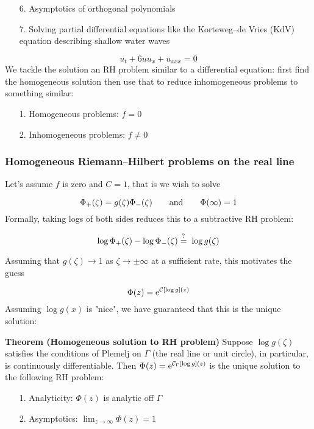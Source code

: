\documentclass[12pt,landscape]{article}
\def\qqand{\qquad\hbox{and}\qquad}
\def\E{ {\rm e} }
\def\CC{ {\cal C} }
\def\endash{–}
\def\questionequals{= \!\!\!\!\!\!{\scriptstyle ? \atop }\,\,\,}
\begin{document}
{\begin{itemize}
\item[6. ] Asymptotics of orthogonal polynomials


\item[7. ] Solving partial differential equations like the Korteweg\ensuremath{\endash}de Vries (KdV) equation describing shallow water waves

\end{itemize}
\[
u_t + 6u u_x + u_{xxx} = 0
\]
We tackle the solution an RH problem similar to a differential equation: first find the homogeneous solution then use that to reduce inhomogeneous problems to something similar:

\begin{itemize}
\item[1. ] Homogeneous problems: $f = 0$


\item[2. ] Inhomogeneous problems: $f \neq 0$

\end{itemize}
\subsubsection{Homogeneous Riemann\ensuremath{\endash}Hilbert problems on the real line}
Let's assume $f$ is zero and $C = 1$, that is we wish to solve

\[
\Phi_+(\zeta) = g(\zeta) \Phi_-(\zeta) \qqand \Phi(\infty) = 1
\]
Formally, taking logs of both sides reduces this to a subtractive RH problem:

\[
\log \Phi_+(\zeta) - \log\Phi_-(\zeta) \questionequals \log g(\zeta)
\]
Assuming that $g(\zeta) \rightarrow 1$ as $\zeta \rightarrow \pm \infty$ at a sufficient rate, this motivates the guess

\[
\Phi(z) = \E^{\CC[\log g](z)}
\]
Assuming $\log g(x)$ is "nice", we have guaranteed that this is the unique solution:

\textbf{Theorem (Homogeneous solution to RH problem)} Suppose $\log g(\zeta)$ satisfies the conditions of Plemelj on $\Gamma$ (the real line or unit circle), in particular, is continuously differentiable. Then $\Phi(z) = \E^{\CC_\Gamma[\log g](z)}$ is the unique solution to the following RH problem:

\begin{itemize}
\item[1. ] Analyticity: $\Phi(z)$ is analytic off $\Gamma$


\item[2. ] Asymptotics: $\lim_{z\rightarrow \infty}\Phi(z) = 1$



\end{itemize}}
\end{document}
